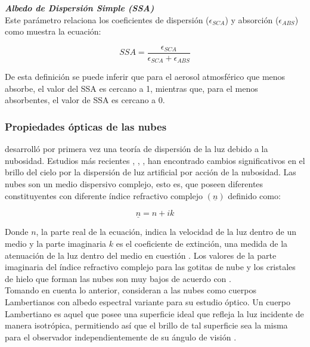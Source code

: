 \textit{\textbf{Albedo de Dispersión Simple (SSA)}}\\

Este parámetro relaciona los coeficientes de dispersión ($\epsilon_{SCA}$) y absorción ($\epsilon_{ABS}$) \citep{Foot1987} como muestra la ecuación:

\begin{equation}
SSA = \frac{\epsilon_{SCA}}{\epsilon_{SCA} + \epsilon_{ABS}}
\end{equation}

De esta definición se puede inferir que para el aerosol atmosférico que menos absorbe, el valor del SSA es cercano a 1, mientras que, para el menos absorbentes, el valor de SSA es cercano a 0.\\

\subsubsection{Propiedades ópticas de las nubes}

\cite{Twomey1967} desarrolló por primera vez una teoría de dispersión de la luz debido a la nubosidad. Estudios más recientes \citep{Kocifaj2007}, \citep{Solano2014}, \citep{Solano2015}, han encontrado cambios significativos en el brillo del cielo por la dispersión de luz artificial por acción de la nubosidad. Las nubes son un medio dispersivo complejo, esto es, que poseen diferentes constituyentes con diferente índice refractivo complejo $(\underline{n})$ definido como:

\begin{equation}
\underline{n} = n + i k
\end{equation}

\vspace{2mm} 

Donde $n$, la parte real de la ecuación, indica la velocidad de la luz dentro de un medio y la parte imaginaria $k$ es el coeficiente de extinción, una medida de la atenuación de la luz dentro del medio en cuestión \citep{Born&Wolf2003}. Los valores de la parte imaginaria del índice refractivo complejo para las gotitas de nube y los cristales de hielo que forman las nubes son muy bajos de acuerdo con \cite{Solano2015}.\\

Tomando en cuenta lo anterior, \cite{Solano2015} consideran a las nubes como cuerpos Lambertianos con albedo espectral variante para su estudio óptico. Un cuerpo Lambertiano es aquel que posee una superficie ideal que refleja la luz incidente de manera isotrópica, permitiendo así que el brillo de tal superficie sea la misma para el observador independientemente de su ángulo de visión \citep{Born&Wolf2003}.\\

